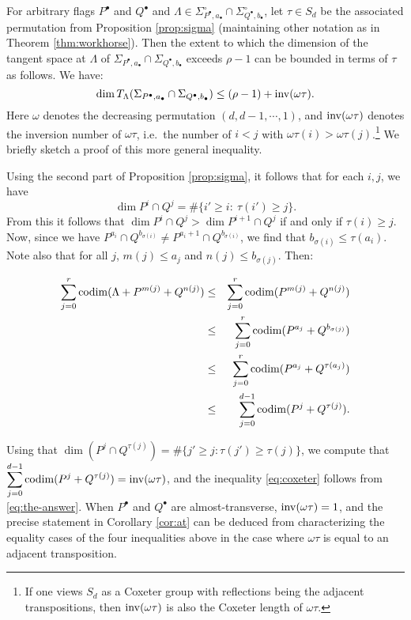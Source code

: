 \documentclass{amsart}
\begin{document}
\begin{rem}\label{rem:arbitrary-flags}

For arbitrary flags $P^{\bullet}$ and $Q^{\bullet}$ and $\Lambda\in\Sigma^\circ_{P^\bullet,a_{\bullet}}\cap \Sigma^\circ_{Q^\bullet,b_{\bullet}}$, let $\tau\in S_d$ be 
the associated permutation from Proposition 
\ref{prop:sigma} (maintaining other notation as in Theorem 
\ref{thm:workhorse}). Then the extent to which 
the dimension of the tangent space at $\Lambda$ of 
$\Sigma_{P^{\bullet},a_{\bullet}} \cap \Sigma_{Q^{\bullet},b_{\bullet}}$
exceeds $\rho-1$ can be bounded in terms of $\tau$ as follows. We have:
\begin{equation} \label{eq:coxeter}
\dim T_\Lambda (\Sigma_{P^{\bullet},a_{\bullet}} \cap \Sigma_{Q^{\bullet},b_{\bullet}})
 \leq (\rho-1) + \operatorname{inv}( \omega \tau ).
\end{equation}
Here $\omega$ denotes the decreasing permutation $(d,d-1,\cdots,1)$, and $\operatorname{inv}(\omega\tau)$
denotes the inversion number of $\omega\tau$, i.e.\ the number of $i<j$ with 
$\omega\tau(i)>\omega\tau(j)$.\footnote{If one views $S_d$ as a Coxeter group
with reflections being the adjacent transpositions, then $\operatorname{inv}(\omega \tau)$
is also the Coxeter length of $\omega \tau$.}
We briefly sketch a proof of this more general inequality.

Using the second part of Proposition \ref{prop:sigma}, it follows that for 
each $i,j$, we have
$$ \dim P^i \cap Q^j = \# \{ i' \geq i:\ \tau(i') \geq j \}. $$
From this it follows that $\dim P^i \cap Q^j > \dim P^{i+1} \cap Q^j$ if and 
only if $\tau(i) \geq j$. Now, since we have 
$P^{a_i} \cap Q^{b_{\sigma(i)}} \neq P^{a_i+1} \cap
Q^{b_{\sigma(i)}}$, we find 
that $b_{\sigma(i)} \leq \tau(a_i)$. Note also that for all $j$, $m(j) \leq a_j$ and $n(j) \leq b_{\sigma(j)}$. Then:

\begin{eqnarray*}
\sum_{j=0}^r \operatorname{codim} ( \Lambda + P^{m(j)} + Q^{n(j)} ) &\leq&
\sum_{j=0}^r \operatorname{codim}(P^{m(j)} + Q^{n(j)})\\
&\leq& \sum_{j=0}^r \operatorname{codim}(P^{a_j} + Q^{b_{\sigma(j)}})\\
&\leq& \sum_{j=0}^r \operatorname{codim}( P^{a_j} + Q^{\tau(a_j)} )\\
&\leq& \sum_{j=0}^{d-1} \operatorname{codim}( P^j + Q^{\tau(j)}).
\end{eqnarray*}

Using that
$\dim(P^j \cap Q^{\tau(j)})=\#\{j' \geq j: \tau(j') \geq \tau(j)\}$, we 
compute that $\displaystyle \sum_{j=0}^{d-1} \operatorname{codim}( P^j
+ Q^{\tau(j)}) = \operatorname{inv}(\omega \tau)$, and the inequality \eqref{eq:coxeter} 
follows from \eqref{eq:the-answer}. 
When $P^{\bullet}$ and $Q^{\bullet}$ are almost-transverse, $\operatorname{inv}(\omega
\tau) = 1$, and 
the precise statement in Corollary
\ref{cor:at} can be deduced from characterizing the equality cases of the four inequalities above in the case where $\omega \tau$ is equal to an
adjacent transposition.
\end{rem}
\end{document}
